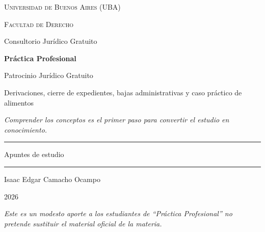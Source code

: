 \documentclass[12pt,oneside]{book}
\newcommand{\universidad}{Universidad de Buenos Aires (UBA)}
\newcommand{\facultad}{Facultad de Derecho}
\newcommand{\carrera}{Consultorio Jurídico Gratuito}
\newcommand{\materia}{Práctica Profesional}
\newcommand{\autor}{Isaac Edgar Camacho Ocampo}
\newcommand{\anio}{2026}
\begin{document}
\begin{titlepage}

\thispagestyle{empty}

\begin{center}

\vspace*{1cm}

{\large \textsc{\universidad}}

\vspace{0.2cm}

{\large \textsc{\facultad}}

\vspace{0.2cm}

{\large \carrera}

\vspace{3cm}

{\Huge \textbf{\materia}}

\vspace{1cm}

{\LARGE Patrocinio Jurídico Gratuito}

\vspace{0.4cm}

{\large Derivaciones, cierre de expedientes, bajas administrativas y caso práctico de alimentos}

\vspace{0.8cm}

\textit{Comprender los conceptos es el primer paso para convertir el estudio en conocimiento.}

\vspace{1.2cm}

\rule{0.70\textwidth}{0.5pt}

\vspace{0.5cm}

{\large Apuntes de estudio}

\vspace{0.5cm}

\rule{0.70\textwidth}{0.5pt}

\vfill

{\large \autor}

\vspace{0.3cm}

{\large \anio}

\end{center}

\vfill

\begin{flushleft}
\textit{Este es un modesto aporte a los estudiantes de ``Práctica Profesional'' no pretende sustituir el material oficial de la materia.}
\end{flushleft}

\end{titlepage}
\end{document}

